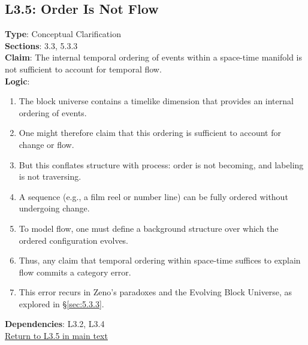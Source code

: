 \documentclass[12pt]{book}
\newcommand{\returnlink}[1]{\hyperref[logic:#1]{Return to #1 in main text}\xspace}
\begin{document}
\subsection*{L3.5: Order Is Not Flow}
\label{appendix:L3.5}
\textbf{Type}: Conceptual Clarification\\
\textbf{Sections}: 3.3, 5.3.3\\
\textbf{Claim}: The internal temporal ordering of events within a space-time manifold is not sufficient to account for temporal flow.\\
\textbf{Logic}:
\begin{enumerate}
    \item The block universe contains a timelike dimension that provides an internal ordering of events.
    \item One might therefore claim that this ordering is sufficient to account for change or flow.
    \item But this conflates structure with process: order is not becoming, and labeling is not traversing.
    \item A sequence (e.g., a film reel or number line) can be fully ordered without undergoing change.
    \item To model flow, one must define a background structure over which the ordered configuration evolves.
    \item Thus, any claim that temporal ordering within space-time suffices to explain flow commits a category error.
    \item This error recurs in Zeno's paradoxes and the Evolving Block Universe, as explored in \S\ref{sec:5.3.3}.
\end{enumerate}
\textbf{Dependencies}: L3.2, L3.4\\
\returnlink{L3.5}
\end{document}
